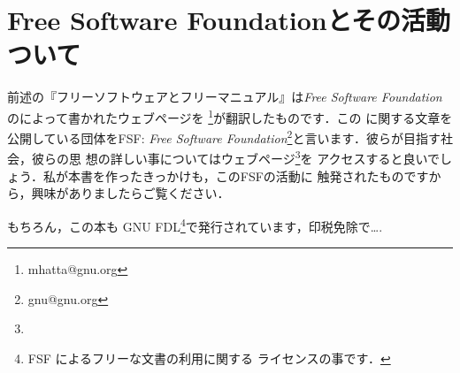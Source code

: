 \endgroup


\section*{Free Software Foundationとその活動ついて}

前述の『フリーソフトウェアとフリーマニュアル』は\emph{Free Software
Foundation}のによって書かれたウェブページを
\footnote{mhatta@gnu.org}が翻訳したものです．この
に関する文章を公開している団体をFSF: \emph{Free Software
Foundation}\footnote{gnu@gnu.org}と言います．彼らが目指す社会，彼らの思
想の詳しい事についてはウェブページ\footnote{\webGNU}を
アクセスすると良いでしょう．私が本書を作ったきっかけも，このFSFの活動に
触発されたものですから，興味がありましたらご覧ください．


もちろん，この本も GNU FDL\footnote{FSF によるフリーな文書の利用に関する
ライセンスの事です．}で発行されています，印税免除で\ldots.

